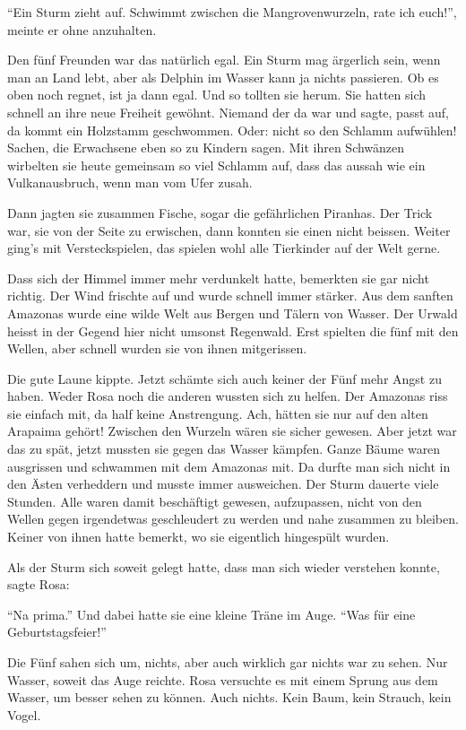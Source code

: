 \enquote{Ein Sturm zieht auf. Schwimmt zwischen die Mangrovenwurzeln, rate ich euch!}, meinte er ohne anzuhalten. 

Den fünf Freunden war das natürlich egal. Ein Sturm mag ärgerlich sein, wenn man an Land lebt, aber als Delphin im Wasser kann ja nichts passieren. Ob es oben noch regnet, ist ja dann egal. Und so tollten sie herum. Sie hatten sich schnell an ihre neue Freiheit gewöhnt. Niemand der da war und sagte, passt auf, da kommt ein Holzstamm geschwommen. Oder: nicht so den Schlamm aufwühlen! Sachen, die Erwachsene eben so zu Kindern sagen. Mit ihren Schwänzen wirbelten sie heute gemeinsam so viel Schlamm auf, dass das aussah wie ein Vulkanausbruch, wenn man vom Ufer zusah.

Dann jagten sie zusammen Fische, sogar die gefährlichen Piranhas. Der Trick war, sie von der Seite zu erwischen, dann konnten sie einen nicht beissen. Weiter ging's mit Versteckspielen, das spielen wohl alle Tierkinder auf der Welt gerne.

Dass sich der Himmel immer mehr verdunkelt hatte, bemerkten sie gar nicht richtig. Der Wind frischte auf und wurde schnell immer stärker. Aus dem sanften Amazonas wurde eine wilde Welt aus Bergen und Tälern von Wasser. Der Urwald heisst in der Gegend hier nicht umsonst Regenwald. Erst spielten die fünf mit den Wellen, aber schnell wurden sie von ihnen mitgerissen.

Die gute Laune kippte. Jetzt schämte sich auch keiner der Fünf mehr Angst zu haben. Weder Rosa noch die anderen wussten sich zu helfen. Der Amazonas riss sie einfach mit, da half keine Anstrengung. Ach, hätten sie nur auf den alten Arapaima gehört! Zwischen den Wurzeln wären sie sicher gewesen. Aber jetzt war das zu spät, jetzt mussten sie gegen das Wasser kämpfen. Ganze Bäume waren ausgrissen und schwammen mit dem Amazonas mit. Da durfte man sich nicht in den Ästen verheddern und musste immer ausweichen. Der Sturm dauerte viele Stunden. Alle waren damit beschäftigt gewesen, aufzupassen, nicht von den Wellen gegen irgendetwas geschleudert zu werden und nahe zusammen zu bleiben. Keiner von ihnen hatte bemerkt, wo sie eigentlich hingespült wurden.

Als der Sturm sich soweit gelegt hatte, dass man sich wieder verstehen konnte, sagte Rosa:

\enquote{Na prima.} Und dabei hatte sie eine kleine Träne im Auge. \enquote{Was für eine Geburtstagsfeier!}

Die Fünf sahen sich um, nichts, aber auch wirklich gar nichts war zu sehen. Nur Wasser, soweit das Auge reichte. Rosa versuchte es mit einem Sprung aus dem Wasser, um besser sehen zu können. Auch nichts. Kein Baum, kein Strauch, kein Vogel.

